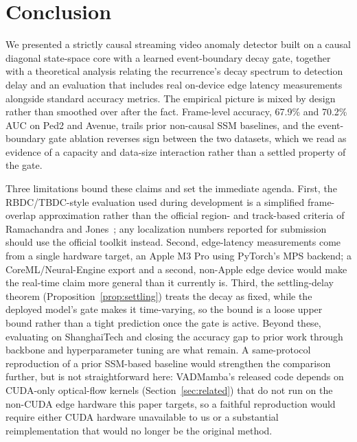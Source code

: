\section{Conclusion}
\label{sec:conclusion}
We presented a strictly causal streaming video anomaly detector built on a causal diagonal state-space core with a learned event-boundary decay gate, together with a theoretical analysis relating the recurrence's decay spectrum to detection delay and an evaluation that includes real on-device edge latency measurements alongside standard accuracy metrics. The empirical picture is mixed by design rather than smoothed over after the fact. Frame-level accuracy, 67.9\% and 70.2\% AUC on Ped2 and Avenue, trails prior non-causal SSM baselines, and the event-boundary gate ablation reverses sign between the two datasets, which we read as evidence of a capacity and data-size interaction rather than a settled property of the gate.

Three limitations bound these claims and set the immediate agenda. First, the RBDC/TBDC-style evaluation used during development is a simplified frame-overlap approximation rather than the official region- and track-based criteria of Ramachandra and Jones~\cite{ramachandra2020streetscene}; any localization numbers reported for submission should use the official toolkit instead. Second, edge-latency measurements come from a single hardware target, an Apple M3 Pro using PyTorch's MPS backend; a CoreML/Neural-Engine export and a second, non-Apple edge device would make the real-time claim more general than it currently is. Third, the settling-delay theorem (Proposition~\ref{prop:settling}) treats the decay as fixed, while the deployed model's gate makes it time-varying, so the bound is a loose upper bound rather than a tight prediction once the gate is active. Beyond these, evaluating on ShanghaiTech and closing the accuracy gap to prior work through backbone and hyperparameter tuning are what remain. A same-protocol reproduction of a prior SSM-based baseline would strengthen the comparison further, but is not straightforward here: VADMamba's released code depends on CUDA-only optical-flow kernels (Section~\ref{sec:related}) that do not run on the non-CUDA edge hardware this paper targets, so a faithful reproduction would require either CUDA hardware unavailable to us or a substantial reimplementation that would no longer be the original method.
